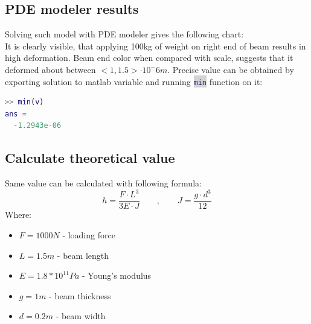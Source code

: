 \documentclass[onecolumn]{article}
\newcommand{\inlinecode}[2]{\colorbox{lightgray}{\lstinline[language=#1]$#2$}}
\begin{document}
\subsection{PDE modeler results}
Solving such model with PDE modeler gives the following chart: \\
\noindent{}
It is clearly visible, that applying 100kg of weight on right end of beam results in high deformation. Beam end color when compared with scale, suggests that it deformed about between $<1, 1.5> \cdot 10^-6 m$. Precise value can be obtained by exporting solution to matlab variable and running \inlinecode{matlab}{min} function on it:
\begin{lstlisting}[language=Matlab,frame=single,label={lst:autocorr},breaklines=true,caption={Obtaining minimal value of spatial deformation}]
>> min(v)
ans =
  -1.2943e-06
\end{lstlisting}

\newpage
\subsection{Calculate theoretical value}
Same value can be calculated with following formula:
\begin{equation}
   h = \frac{F \cdot L^3}{3E \cdot J} \qquad,\qquad J = \frac{g \cdot d^3}{12}
\end{equation}
Where:
\begin{itemize}
     \item $F = 1000 N$ - loading force
     \item $L = 1.5 m$ - beam length
     \item $E = 1.8 * 10^11 Pa$ - Young's modulus
     \item $g = 1m$ - beam thickness
     \item $d = 0.2m$ - beam width
\end{itemize}
\end{document}
